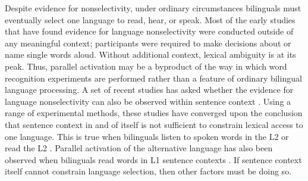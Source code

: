  

Despite evidence for nonselectivity, under ordinary circumstances bilinguals must eventually select one language to read, hear, or speak. Most of the early studies that have found evidence for language nonselectivity were  conducted outside of any meaningful context; participants were required to make decisions about or name single words aloud. Without additional context, lexical ambiguity is at its peak. Thus, parallel activation may be a byproduct of the way in which word recognition experiments are performed rather than a feature of ordinary bilingual language processing. A set of recent studies has asked whether the evidence for language nonselectivity can also be observed within sentence context \parencite[][]{Baten2010,Chambers2009, Duyck2007, Libben2009, Schwartz2006, VanAssche2009, VanAssche2010, VanHell2008}. Using a range of experimental methods, these studies have converged upon the conclusion that sentence context in and of itself is not sufficient to constrain lexical access to one language. This is true when bilinguals listen to spoken words in the L2 \parencite[e.g.,][]{Chambers2009} or read the L2 \parencite[][]{Baten2010,Duyck2007, Libben2009, Schwartz2006, VanAssche2010, VanHell2008}. Parallel activation of the alternative language has also been observed when bilinguals read words in L1 sentence contexts \parencite[][]{VanAssche2009}. If sentence context itself cannot constrain language selection, then other factors must be doing so.

